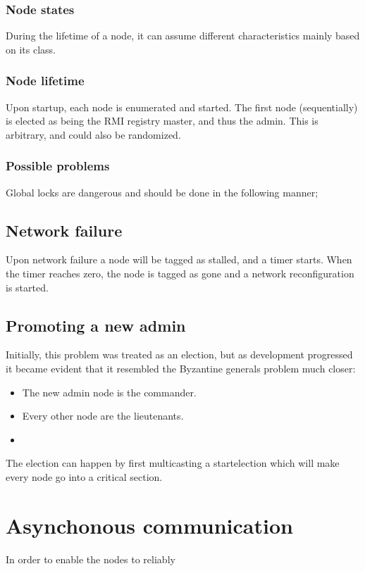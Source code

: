\documentclass[10pt,a4paper]{article}
\begin{document}
\subsubsection{Node states}
During the lifetime of a node, it can assume different characteristics mainly based on its class.

\subsubsection{Node lifetime}
Upon startup, each node is enumerated and started. The first node (sequentially) is elected as being the RMI registry master, and thus the admin. This is arbitrary, and could also be randomized.

\subsubsection{Possible problems}
Global locks are dangerous and should be done in the following manner; 

\subsection{Network failure}

Upon network failure a node will be tagged as stalled, and a timer starts. When the timer reaches zero, the node is tagged as gone and a network reconfiguration is started.

\subsection{Promoting a new admin}
Initially, this problem was treated as an election, but as development progressed it became evident that it resembled the Byzantine generals problem much closer:
\begin{itemize}
\item The new admin node is the commander.
\item Every other node are the lieutenants.
\item 
\end{itemize}

The election can happen by first multicasting a startelection which will make every node go into a critical section.

\section{Asynchonous communication}
In order to enable the nodes to reliably 
\end{document}
